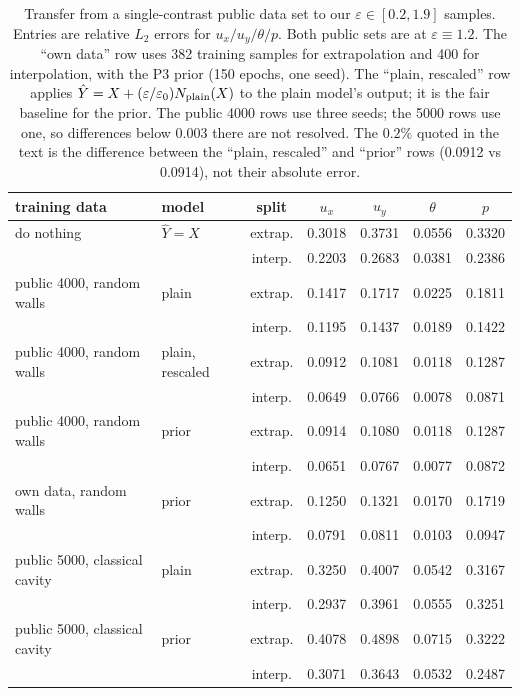 \documentclass[preprint,11pt,a4paper,times]{elsarticle}
\begin{document}
\begin{table}[htbp]
\centering
\caption{Transfer from a single-contrast public data set to our
$\varepsilon\in[0.2,1.9]$ samples. Entries are relative $L_2$ errors for
$u_x/u_y/\theta/p$. Both public sets are at $\varepsilon\equiv1.2$. The ``own data'' row uses
382 training samples for extrapolation and 400 for interpolation, with the P3 prior (150
epochs, one seed). The ``plain, rescaled'' row applies
$\hat Y=X+(\varepsilon/\varepsilon_0)N_{\rm plain}(X)$ to the plain model's output; it is the
fair baseline for the prior. The public 4000 rows use three seeds; the 5000 rows use one, so
differences below 0.003 there are not resolved. The $0.2\%$ quoted in the text is the
difference between the ``plain, rescaled'' and ``prior'' rows (0.0912 vs 0.0914), not their
absolute error.}
\label{tab:transfer}
\small
\setlength{\tabcolsep}{4pt}
\begin{tabular}{@{}llccccc@{}}
\toprule
training data & model & split & $u_x$ & $u_y$ & $\theta$ & $p$\\
\midrule
do nothing & $\hat Y=X$ & extrap. & 0.3018 & 0.3731 & 0.0556 & 0.3320\\
 &  & interp. & 0.2203 & 0.2683 & 0.0381 & 0.2386\\
public 4000, random walls & plain & extrap. & 0.1417 & 0.1717 & 0.0225 & 0.1811\\
 &  & interp. & 0.1195 & 0.1437 & 0.0189 & 0.1422\\
public 4000, random walls & plain, rescaled & extrap. & 0.0912 & 0.1081 & 0.0118 & 0.1287\\
 &  & interp. & 0.0649 & 0.0766 & 0.0078 & 0.0871\\
public 4000, random walls & prior & extrap. & 0.0914 & 0.1080 & 0.0118 & 0.1287\\
 &  & interp. & 0.0651 & 0.0767 & 0.0077 & 0.0872\\
own data, random walls & prior & extrap. & 0.1250 & 0.1321 & 0.0170 & 0.1719\\
 &  & interp. & 0.0791 & 0.0811 & 0.0103 & 0.0947\\
public 5000, classical cavity & plain & extrap. & 0.3250 & 0.4007 & 0.0542 & 0.3167\\
 &  & interp. & 0.2937 & 0.3961 & 0.0555 & 0.3251\\
public 5000, classical cavity & prior & extrap. & 0.4078 & 0.4898 & 0.0715 & 0.3222\\
 &  & interp. & 0.3071 & 0.3643 & 0.0532 & 0.2487\\
\bottomrule
\end{tabular}
\end{table}
\end{document}
